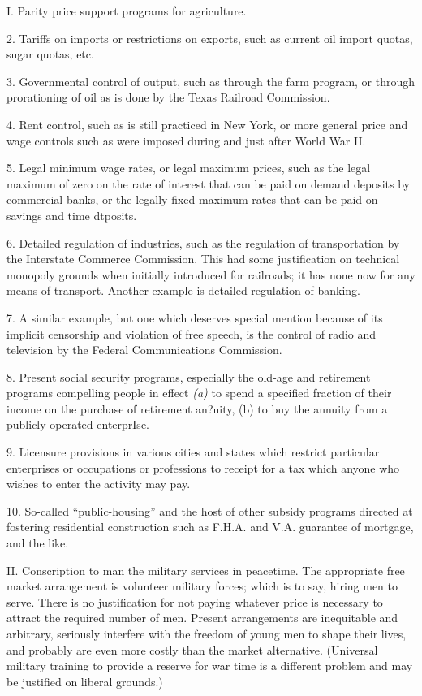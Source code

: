 \documentclass[11pt,openany]{book}
\begin{document}
I. Parity price support programs for agriculture.

2. Tariffs on imports or restrictions on exports, such as current oil import quotas, sugar quotas, etc.

3. Governmental control of output, such as through the farm program, or through prorationing of oil as is done by the Texas Railroad Commission.

4. Rent control, such as is still practiced in New York, or more general price and wage controls such as were imposed during and just after World War II.

5. Legal minimum wage rates, or legal maximum prices, such as the legal maximum of zero on the rate of interest that can be paid on demand deposits by commercial banks, or the legally fixed maximum rates that can be paid on savings and time dtposits.

6. Detailed regulation of industries, such as the regulation of transportation by the Interstate Commerce Commission. This had some justification on technical monopoly grounds when initially introduced for railroads; it has none now for any means of transport. Another example is detailed regulation of banking.

7. A similar example, but one which deserves special mention because of its implicit censorship and violation of free speech, is the control of radio and television by the Federal Communications Commission.

8. Present social security programs, especially the old-age and retirement programs compelling people in effect \emph{(a)} to spend a specified fraction of their income on the purchase of retirement an?uity, (b) to buy the annuity from a publicly operated enterprIse.

9. Licensure provisions in various cities and states which restrict particular enterprises or occupations or professions to receipt for a tax which anyone who wishes to enter the activity may pay.

10. So-called ``public-housing'' and the host of other subsidy programs directed at fostering residential construction such as F.H.A. and V.A. guarantee of mortgage, and the like.

II. Conscription to man the military services in peacetime. The appropriate free market arrangement is volunteer military forces; which is to say, hiring men to serve. There is no justification for not paying whatever price is necessary to attract the required number of men. Present arrangements are inequitable and arbitrary, seriously interfere with the freedom of young men to shape their lives, and probably are even more costly than the market alternative. (Universal military training to provide a reserve for war time is a different problem and may be justified on liberal grounds.)
\end{document}

